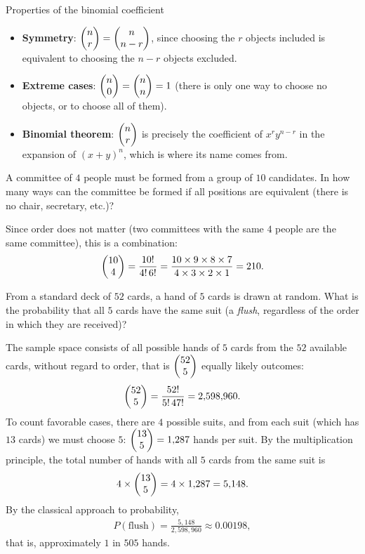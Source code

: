 {Properties of the binomial coefficient}
\begin{itemize}
	\item \textbf{Symmetry}: $\begin{pmatrix} n \\ r\end{pmatrix} = \begin{pmatrix} n \\ n-r\end{pmatrix}$, since choosing the $r$ objects included is equivalent to choosing the $n-r$ objects excluded.
	\item \textbf{Extreme cases}: $\begin{pmatrix} n \\ 0\end{pmatrix} = \begin{pmatrix} n \\ n\end{pmatrix} = 1$ (there is only one way to choose no objects, or to choose all of them).
	\item \textbf{Binomial theorem}: $\begin{pmatrix} n \\ r\end{pmatrix}$ is precisely the coefficient of $x^r y^{n-r}$ in the expansion of $(x+y)^n$, which is where its name comes from.
\end{itemize}

\begin{ejemplo}
	\label{exmp:conteo.3}
	A committee of $4$ people must be formed from a group of $10$ candidates. In how many ways can the committee be formed if all positions are equivalent (there is no chair, secretary, etc.)?
\end{ejemplo}

\begin{solucion}
	Since order does not matter (two committees with the same $4$ people are the same committee), this is a combination:
	\begin{align}
		\begin{pmatrix} 10 \\ 4\end{pmatrix} = \frac{10!}{4! \, 6!} = \frac{10 \times 9 \times 8 \times 7}{4 \times 3 \times 2 \times 1} = 210.
	\end{align}
\end{solucion}

\begin{ejemplo}
	\label{exmp:conteo.4}
	From a standard deck of $52$ cards, a hand of $5$ cards is drawn at random. What is the probability that all $5$ cards have the same suit (a \emph{flush}, regardless of the order in which they are received)?
\end{ejemplo}

\begin{solucion}
	The sample space consists of all possible hands of $5$ cards from the $52$ available cards, without regard to order, that is $\begin{pmatrix} 52 \\ 5\end{pmatrix}$ equally likely outcomes:
	\begin{align}
		\begin{pmatrix} 52 \\ 5\end{pmatrix} = \frac{52!}{5!\,47!} = 2{,}598{,}960.
	\end{align}
	To count favorable cases, there are $4$ possible suits, and from each suit (which has $13$ cards) we must choose $5$: $\begin{pmatrix} 13 \\ 5\end{pmatrix} = 1{,}287$ hands per suit. By the multiplication principle, the total number of hands with all $5$ cards from the same suit is
	\begin{align}
		4 \times \begin{pmatrix} 13 \\ 5\end{pmatrix} = 4 \times 1{,}287 = 5{,}148.
	\end{align}
	By the classical approach to probability,
	\begin{align}
		P(\text{flush}) = \frac{5{,}148}{2{,}598{,}960} \approx 0.00198,
	\end{align}
	that is, approximately $1$ in $505$ hands.
\end{solucion}
